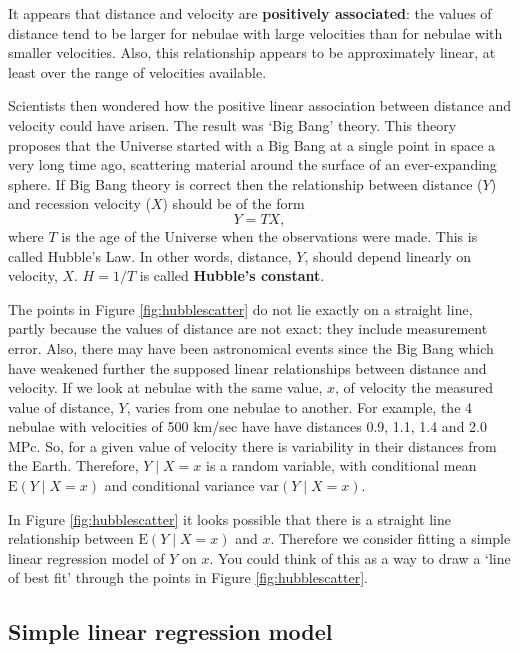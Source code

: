 \documentclass[
  british,
  11pt,
  openany, a4paper]{book}
\begin{document}
It appears that distance and velocity are \textbf{positively associated}: the values of distance tend to be larger for nebulae with large velocities than for nebulae with smaller velocities. Also, this relationship appears to be approximately linear, at least over the range of velocities available.

Scientists then wondered how the positive linear association between distance and velocity could have arisen. The result was `Big Bang' theory. This theory proposes that the Universe started with a Big Bang at a single point in space a very long time ago, scattering material around the surface of an ever-expanding sphere. If Big Bang theory is correct then the relationship between distance (\(Y\)) and recession velocity (\(X\)) should be of the form
\[ Y = T X, \]
where \(T\) is the age of the Universe when the observations were made. This is called Hubble's Law. In other words, distance, \(Y\), should depend linearly on velocity, \(X\). \(H=1/T\) is called \textbf{Hubble's constant}.

The points in Figure \ref{fig:hubblescatter} do not lie exactly on a straight line, partly because the values of distance are not exact: they include measurement error. Also, there may have been astronomical events since the Big Bang which have weakened further the supposed linear relationships between distance and velocity. If we look at nebulae with the same value, \(x\), of velocity the measured value of distance, \(Y\), varies from one nebulae to another. For example, the 4 nebulae with velocities of 500 km/sec have have distances 0.9, 1.1, 1.4 and 2.0 MPc. So, for a given value of velocity there is variability in their distances from the Earth. Therefore, \(Y \mid X=x\) is a random variable, with conditional mean \(\text{E}(Y \mid X=x)\) and conditional variance \(\text{var}(Y \mid X=x)\).

In Figure \ref{fig:hubblescatter} it looks possible that there is a straight line relationship between \(\text{E}(Y \mid X=x)\) and \(x\). Therefore we consider fitting a simple linear regression model of \(Y\) on \(x\). You could think of this as a way to draw a `line of best fit' through the points in Figure \ref{fig:hubblescatter}.

\subsection{Simple linear regression model}\label{simple-linear-regression-model}
\end{document}
